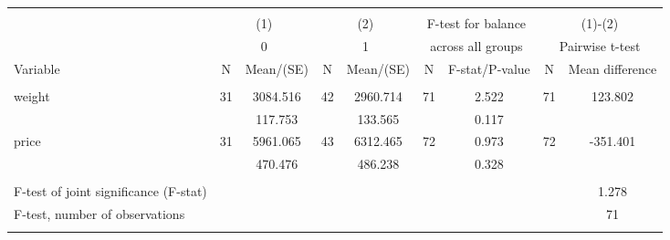\begin{tabular}{@{\extracolsep{5pt}}lcccccccc}
\\[-1.8ex]\hline \hline \\[-1.8ex]
 & \multicolumn{2}{c}{(1)}  & \multicolumn{2}{c}{(2)}  & \multicolumn{2}{c}{F-test for balance} & \multicolumn{2}{c}{(1)-(2)} \\
 & \multicolumn{2}{c}{0}  & \multicolumn{2}{c}{1}  & \multicolumn{2}{c}{across all groups} & \multicolumn{2}{c}{Pairwise t-test}  \\
Variable & N & Mean/(SE) & N & Mean/(SE) & N & F-stat/P-value & N & Mean difference \\ \hline \\[-1.8ex] 
weight   & 31    &  3084.516    & 42    &  2960.714    & 71    &     2.522    & 71    &   123.802   \\
 &   &   117.753  &   &   133.565  &   &     0.117  &   &   \\
price   & 31    &  5961.065    & 43    &  6312.465    & 72    &     0.973    & 72    &  -351.401   \\
 &   &   470.476  &   &   486.238  &   &     0.328  &   &   \\
\hline \\[-1.8ex]
F-test of joint significance (F-stat) & &   & &   & &     & &      1.278   \\
F-test, number of observations & &   & &   & &   & &  71   \\
\hline \\[-1.8ex]

\end{tabular}

